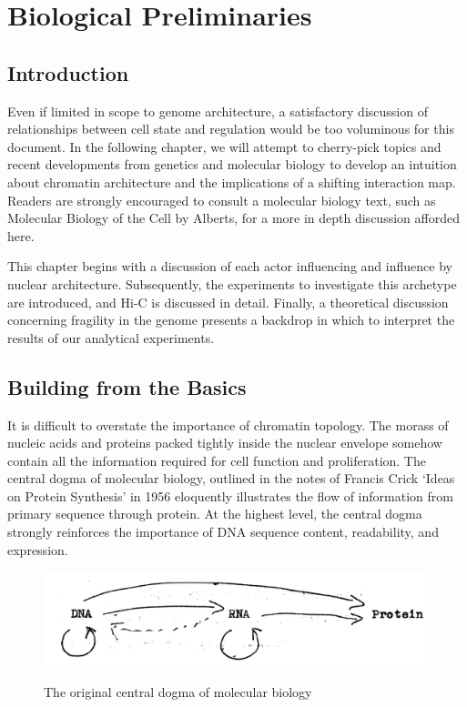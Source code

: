 
\chapter{Biological Preliminaries}

\section*{Introduction}

Even if limited in scope to genome architecture, a satisfactory discussion of relationships between cell state and regulation would
be too voluminous for this document.  In the following chapter, we will attempt to cherry-pick topics and recent
developments from genetics and molecular biology to develop an intuition about chromatin architecture and the implications
of a shifting interaction map.  Readers are strongly encouraged to consult a molecular biology text, such as Molecular Biology of the Cell by
Alberts\cite{alberts2002}, for a more in depth discussion afforded here.

This chapter begins with a discussion of each actor influencing and influence by nuclear architecture.  Subsequently, the experiments
to investigate this archetype are introduced, and Hi-C is discussed in detail.  Finally, a theoretical discussion concerning
fragility in the genome presents a backdrop in which to interpret the results of our analytical experiments.


\section*{Building from the Basics}

It is difficult to overstate the importance of chromatin topology.  The morass of nucleic acids and proteins packed tightly inside the
nuclear envelope somehow contain all the information required for cell function and proliferation.  The central dogma of molecular biology,
outlined in the notes of Francis Crick `Ideas on Protein Synthesis' in 1956\cite{crick1970} eloquently illustrates the flow of
information from primary sequence through protein.  At the highest level, the central dogma strongly reinforces the importance of
\gls{DNA} sequence content, readability, and expression.

\begin{figure}[b]
  \centering
  \caption{The original central dogma of molecular biology\cite{crick1970}}
  \includegraphics[width=\textwidth]{figures/biology/dogma}\label{fig:dogma}
\end{figure}


